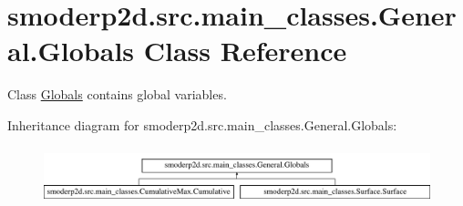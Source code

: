 \hypertarget{classsmoderp2d_1_1src_1_1main__classes_1_1General_1_1Globals}{\section{smoderp2d.\-src.\-main\-\_\-classes.\-General.\-Globals Class Reference}
\label{classsmoderp2d_1_1src_1_1main__classes_1_1General_1_1Globals}
}


Class \hyperlink{classsmoderp2d_1_1src_1_1main__classes_1_1General_1_1Globals}{Globals} contains global variables.  


Inheritance diagram for smoderp2d.\-src.\-main\-\_\-classes.\-General.\-Globals\-:\begin{figure}[H]
\begin{center}
\leavevmode
\includegraphics[height=1.651917cm]{classsmoderp2d_1_1src_1_1main__classes_1_1General_1_1Globals}
\end{center}
\end{figure}
